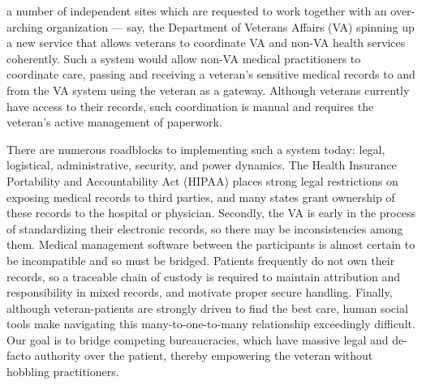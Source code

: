 %
%
%

a number of independent sites which are requested to work together with an over-arching organization --- say, the Department of Veterans Affairs (VA) spinning up a new service that allows veterans to coordinate VA and non-VA health services coherently.
Such a system would allow non-VA medical practitioners to coordinate care, passing and receiving a veteran's sensitive medical records to and from the VA system using the veteran as a gateway.
Although veterans currently have access to their records, such coordination is manual and requires the veteran's active management of paperwork.

There are numerous roadblocks to implementing such a system today: legal, logistical, administrative, security, and power dynamics.
The Health Insurance Portability and Accountability Act (HIPAA) places strong legal restrictions on exposing medical records to third parties, and many states grant ownership of these records to the hospital or physician.
Secondly, the VA is early in the process of standardizing their electronic records, so there may be inconsistencies among them.
Medical management software between the participants is almost certain to be incompatible and so must be bridged.
Patients frequently do not own their records, so a traceable chain of custody is required to maintain attribution and responsibility in mixed records, and motivate proper secure handling.
Finally, although veteran-patients are strongly driven to find the best care, human social tools make navigating this many-to-one-to-many relationship exceedingly difficult.
Our goal is to bridge competing bureaucracies, which have massive legal and de-facto authority over the patient, thereby empowering the veteran without hobbling practitioners.
